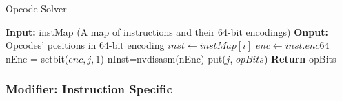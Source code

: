 \begin{algorithm}[htbp]
      \caption{Opcode Solver}\label{algo:opcode}
  \begin{algorithmic}[1]
      \State \textbf {Input:} instMap (A map of instructions and their 64-bit encodings)
      \State \textbf {Onput:} Opcodes' positions in 64-bit encoding
      \State $inst \gets instMap[i]$
      \State $enc \gets inst.enc64$
      \State nEnc = setbit($enc, j, 1$)
      \State nInst=nvdisasm(nEnc)
      \State put($j$, $opBits$)
      \EndIf
      \EndIf
      \EndFor
      \EndFor
      \State \textbf{Return} opBits %
  \end{algorithmic}
\end{algorithm}

\subsubsection{Modifier: Instruction Specific}

